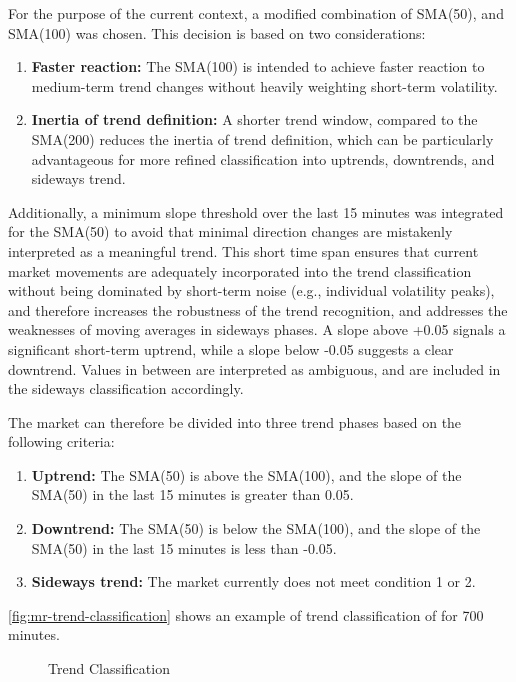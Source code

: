 For the purpose of the current context, a modified combination of SMA(50), and SMA(100) was chosen. This decision is based on two considerations:

\begin{enumerate}
    \item \textbf{Faster reaction:} The SMA(100) is intended to achieve faster reaction to medium-term trend changes without heavily weighting short-term volatility.
    \item \textbf{Inertia of trend definition:} A shorter trend window, compared to the SMA(200) reduces the inertia of trend definition, which can be particularly advantageous for more refined classification into uptrends, downtrends, and sideways trend.
\end{enumerate}

Additionally, a minimum slope threshold over the last 15 minutes was integrated for the SMA(50) to avoid that minimal direction changes are mistakenly interpreted as a meaningful trend. This short time span ensures that current market movements are adequately incorporated into the trend classification without being dominated by short-term noise (e.g., individual volatility peaks), and therefore increases the robustness of the trend recognition, and addresses the weaknesses of moving averages in sideways phases. A slope above +0.05 signals a significant short-term uptrend, while a slope below -0.05 suggests a clear downtrend. Values in between are interpreted as ambiguous, and are included in the sideways classification accordingly.

The market can therefore be divided into three trend phases based on the following criteria:

\begin{enumerate}
    \item \textbf{Uptrend:} The SMA(50) is above the SMA(100), and the slope of the SMA(50) in the last 15 minutes is greater than 0.05.
    \item \textbf{Downtrend:} The SMA(50) is below the SMA(100), and the slope of the SMA(50) in the last 15 minutes is less than -0.05.
    \item \textbf{Sideways trend:} The market currently does not meet condition 1 or 2.
\end{enumerate}

\autoref{fig:mr-trend-classification} shows an example of trend classification of \ethusdc for 700 minutes.

\begin{figure}[H]
    \centering
    
    \caption{Trend Classification}
    \label{fig:mr-trend-classification}
\end{figure}

